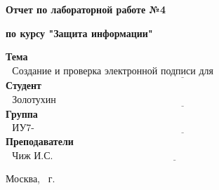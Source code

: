 \begin{center}
	\Large\textbf{Отчет по лабораторной работе №4}
	
	\Large\textbf {по курсу "Защита информации"}
\end{center}


\noindent\textbf{Тема} $\underline{\text{~~Создание и проверка электронной подписи для документа~~~~~~~~~~~~~~~~~~~~~~~~~~~~~~~~~~~~~~}}$\newline\newline
\noindent\textbf{Студент} $\underline{\text{~~Золотухин А.В.~~~~~~~~~~~~~~~~~~~~~~~~~~~~~~~~~~~~~~~~~~~~~~~~~~~~~~~~~~~~~~~~~~~~~~~~~~~~~~~~~~~~~~~~~~}}$\newline\newline
\noindent\textbf{Группа} $\underline{\text{~~ИУ7-74Б~~~~~~~~~~~~~~~~~~~~~~~~~~~~~~~~~~~~~~~~~~~~~~~~~~~~~~~~~~~~~~~~~~~~~~~~~~~~~~~~~~~~~~~~~~~~~~~~~~~~~~}}$\newline\newline
\noindent\textbf{Преподаватели} $\underline{\text{~~Чиж И.С. ~~~~~~~~~~~~~~~~~~~~~~~~~~~~~~~~~~~~~~~~~~~~~~~~~~~~~~~~~~~~~~~~~~~~~~~~~~~~~~~~~~~~~~~~}}$\newline

\begin{center}
	\vfill
	Москва, \the\year
	~г.
\end{center}
\restoregeometry